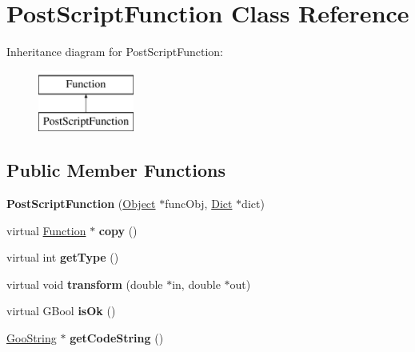\hypertarget{class_post_script_function}{}\section{Post\+Script\+Function Class Reference}
\label{class_post_script_function}
Inheritance diagram for Post\+Script\+Function\+:\begin{figure}[H]
\begin{center}
\leavevmode
\includegraphics[height=2.000000cm]{class_post_script_function}
\end{center}
\end{figure}
\subsection*{Public Member Functions}
\begin{DoxyCompactItemize}
\item 
\mbox{\label{class_post_script_function_a8211ddf8228331a703d4eee813a2842a}} 
{\bfseries Post\+Script\+Function} (\hyperlink{class_object}{Object} $\ast$func\+Obj, \hyperlink{class_dict}{Dict} $\ast$dict)
\item 
\mbox{\label{class_post_script_function_ad13b16438df9d2effda32b8c2b65d81b}} 
virtual \hyperlink{class_function}{Function} $\ast$ {\bfseries copy} ()
\item 
\mbox{\label{class_post_script_function_a8a092c2a72ac3ce8f9a0ba46d0c99898}} 
virtual int {\bfseries get\+Type} ()
\item 
\mbox{\label{class_post_script_function_a666589d2fc871a03c7bed83202e35b05}} 
virtual void {\bfseries transform} (double $\ast$in, double $\ast$out)
\item 
\mbox{\label{class_post_script_function_a1e978daa784319210b20cca0d6dafcd0}} 
virtual G\+Bool {\bfseries is\+Ok} ()
\item 
\mbox{\label{class_post_script_function_aa076fae53bc9dfedf64d509fdf1ae17b}} 
\hyperlink{class_goo_string}{Goo\+String} $\ast$ {\bfseries get\+Code\+String} ()
\end{DoxyCompactItemize}
